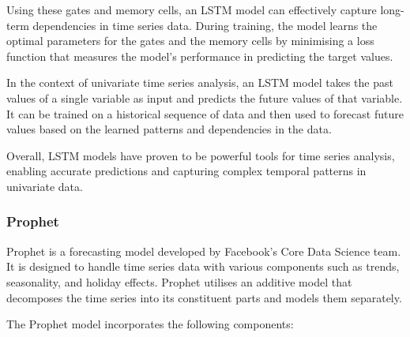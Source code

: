 \documentclass[
]{article}
\begin{document}
Using these gates and memory cells, an LSTM model can effectively
capture long-term dependencies in time series data. During training, the
model learns the optimal parameters for the gates and the memory cells
by minimising a loss function that measures the model's performance in
predicting the target values.

In the context of univariate time series analysis, an LSTM model takes
the past values of a single variable as input and predicts the future
values of that variable. It can be trained on a historical sequence of
data and then used to forecast future values based on the learned
patterns and dependencies in the data.

Overall, LSTM models have proven to be powerful tools for time series
analysis, enabling accurate predictions and capturing complex temporal
patterns in univariate data.

\hypertarget{prophet}{%
\subsubsection{Prophet}\label{prophet}}

Prophet is a forecasting model developed by Facebook's Core Data Science
team. It is designed to handle time series data with various components
such as trends, seasonality, and holiday effects. Prophet utilises an
additive model that decomposes the time series into its constituent
parts and models them separately.

The Prophet model incorporates the following components:
\end{document}
